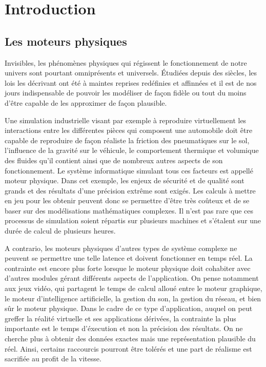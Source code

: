 \section{Introduction}

\subsection{Les moteurs physiques}

Invisibles, les phénomènes physiques qui régissent le fonctionnement de notre univers sont pourtant omniprésents et universels. \'Etudiées depuis des siècles, les lois les décrivant ont été à maintes reprises redéfinies et affinnées et il est de nos jours indispensable de pouvoir les modéliser de façon fidèle ou tout du moins d'être capable de les approximer de façon plausible. 

Une simulation industrielle visant par exemple à reproduire virtuellement les interactions entre les différentes pièces qui composent une automobile doit être capable de reproduire de façon réaliste la friction des pneumatiques sur le sol, l'influence de la gravité sur le véhicule, le comportement thermique et volumique des fluides qu'il contient ainsi que de nombreux autres aspects de son fonctionnement. Le système informatique simulant tous ces facteurs est appellé moteur physique. Dans cet exemple, les enjeux de sécurité et de qualité sont grands et des résultats d'une précision extrême sont exigés. Les calculs à mettre en jeu pour les obtenir peuvent donc se permettre d'être très coûteux et de se baser sur des modélisations mathématiques complexes. Il n'est pas rare que ces processus de simulation soient répartis sur plusieurs machines et s'étalent sur une durée de calcul de plusieurs heures.

A contrario, les moteurs physiques d'autres types de système complexe ne peuvent se permettre une telle latence et doivent fonctionner en temps réel. La contrainte est encore plus forte lorsque le moteur physique doit cohabiter avec d'autres modules gérant différents aspects de l'application. On pense notamment aux jeux vidéo, qui partagent le temps de calcul alloué entre le moteur graphique, le moteur d'intelligence artificielle, la gestion du son, la gestion du réseau, et bien sûr le moteur physique. Dans le cadre de ce type d'application, auquel on peut greffer la réalité virtuelle et ses applications dérivées, la contrainte la plus importante est le temps d'éxecution et non la précision des résultats. On ne cherche plus à obtenir des données exactes mais une représentation plausible du réel. Ainsi, certains raccourcis pourront être tolérés et une part de réalisme est sacrifiée au profit de la vitesse.

